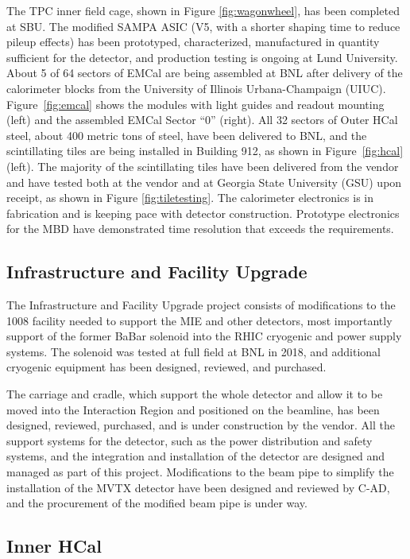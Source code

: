 The TPC inner field cage, shown in Figure \ref{fig:wagonwheel}, has been completed at SBU. The modified SAMPA ASIC (V5, with a shorter shaping time to reduce pileup effects)
has been prototyped, characterized, manufactured in quantity sufficient for the detector, and production testing is ongoing at Lund University.
About 5 of 64 sectors of EMCal are being assembled at BNL after delivery of the
calorimeter blocks from the University of Illinois Urbana-Champaign (UIUC).  Figure~\ref{fig:emcal} shows the modules with light guides and readout mounting (left) and the assembled EMCal Sector ``0'' (right).
All 32 sectors of Outer HCal steel, about 400 metric tons of steel,
have been delivered to BNL, and the scintillating tiles are being installed
in Building 912, as shown in Figure~\ref{fig:hcal} (left).
The majority of the scintillating tiles have been delivered from the vendor
and have tested both at the vendor and at Georgia State University (GSU) upon receipt, as shown in Figure \ref{fig:tiletesting}.
The calorimeter electronics is in fabrication and is keeping pace with detector
construction.
Prototype electronics for the MBD have demonstrated time resolution that exceeds the
requirements.

\subsection{Infrastructure and Facility Upgrade}

The Infrastructure and Facility Upgrade project consists of modifications to the 
1008 facility needed to support the MIE and other detectors, most importantly 
support of the former BaBar solenoid into the RHIC cryogenic and power supply
systems.  
The solenoid was tested at full field at BNL in 2018, and additional cryogenic
equipment has been designed, reviewed, and purchased.

The carriage and cradle, which support the whole detector and allow it to be 
moved into the Interaction Region and positioned on the beamline, has been designed,
reviewed, purchased, and is under construction by the vendor.
All the support systems for the detector, such as the power distribution and safety systems, and the integration and installation of the detector are designed and managed as part of this project.
Modifications to the beam pipe to simplify the installation of the MVTX detector
have been designed and reviewed by C-AD, and the procurement of the modified beam pipe 
is under way.

\subsection{Inner HCal}

